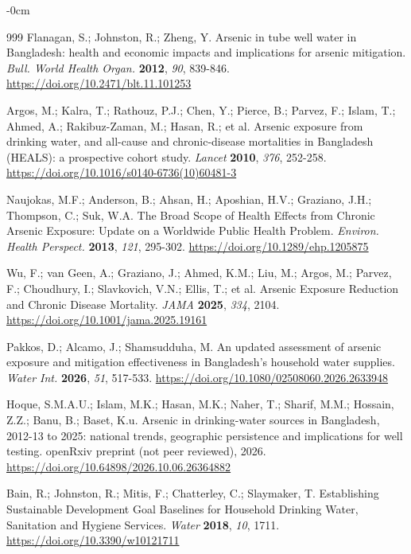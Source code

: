 \documentclass[sustainability,article,submit,pdftex,moreauthors]{Definitions/mdpi}
\begin{document}
\begin{adjustwidth}{-\extralength}{0cm}
\begin{thebibliography}{999}
Flanagan, S.; Johnston, R.; Zheng, Y. Arsenic in tube well water in Bangladesh: health and economic impacts and implications for arsenic mitigation. \textit{Bull. World Health Organ.} \textbf{2012}, \textit{90}, 839-846. \url{https://doi.org/10.2471/blt.11.101253}

Argos, M.; Kalra, T.; Rathouz, P.J.; Chen, Y.; Pierce, B.; Parvez, F.; Islam, T.; Ahmed, A.; Rakibuz-Zaman, M.; Hasan, R.; et al. Arsenic exposure from drinking water, and all-cause and chronic-disease mortalities in Bangladesh (HEALS): a prospective cohort study. \textit{Lancet} \textbf{2010}, \textit{376}, 252-258. \url{https://doi.org/10.1016/s0140-6736(10)60481-3}

Naujokas, M.F.; Anderson, B.; Ahsan, H.; Aposhian, H.V.; Graziano, J.H.; Thompson, C.; Suk, W.A. The Broad Scope of Health Effects from Chronic Arsenic Exposure: Update on a Worldwide Public Health Problem. \textit{Environ. Health Perspect.} \textbf{2013}, \textit{121}, 295-302. \url{https://doi.org/10.1289/ehp.1205875}

Wu, F.; van Geen, A.; Graziano, J.; Ahmed, K.M.; Liu, M.; Argos, M.; Parvez, F.; Choudhury, I.; Slavkovich, V.N.; Ellis, T.; et al. Arsenic Exposure Reduction and Chronic Disease Mortality. \textit{JAMA} \textbf{2025}, \textit{334}, 2104. \url{https://doi.org/10.1001/jama.2025.19161}

Pakkos, D.; Alcamo, J.; Shamsudduha, M. An updated assessment of arsenic exposure and mitigation effectiveness in Bangladesh's household water supplies. \textit{Water Int.} \textbf{2026}, \textit{51}, 517-533. \url{https://doi.org/10.1080/02508060.2026.2633948}

Hoque, S.M.A.U.; Islam, M.K.; Hasan, M.K.; Naher, T.; Sharif, M.M.; Hossain, Z.Z.; Banu, B.; Baset, K.u. Arsenic in drinking-water sources in Bangladesh, 2012-13 to 2025: national trends, geographic persistence and implications for well testing. openRxiv preprint (not peer reviewed), 2026. \url{https://doi.org/10.64898/2026.10.06.26364882}

Bain, R.; Johnston, R.; Mitis, F.; Chatterley, C.; Slaymaker, T. Establishing Sustainable Development Goal Baselines for Household Drinking Water, Sanitation and Hygiene Services. \textit{Water} \textbf{2018}, \textit{10}, 1711. \url{https://doi.org/10.3390/w10121711}


\end{thebibliography}
\end{adjustwidth}
\end{document}
